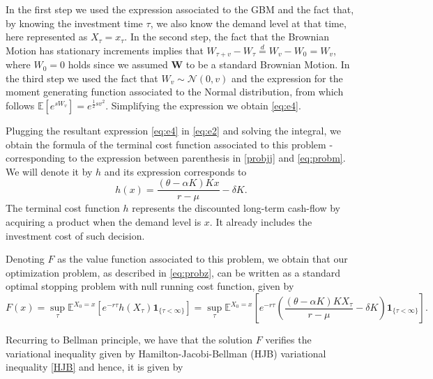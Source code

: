 In the first step we used the expression associated to the GBM and the fact that, by knowing the investment time $\tau$, we also know the demand level at that time, here represented as $X_\tau=x_\tau$. In the second step, the fact that the Brownian Motion has stationary increments implies that $W_{\tau+v}-W_\tau \overset{d}{=} W_v -W_0 = W_v$, where $W_0=0$ holds since we assumed \textbf{W} to be a standard Brownian Motion.
In the third step we used the fact that $ W_v \sim \mathcal{N}(0,v)$ and the expression for the moment generating function associated to the Normal distribution, from which follows $\mathds{E}\left[e^{sW_v}\right]=e^{\frac{1}{2} s v^2}$. Simplifying the expression we obtain \eqref{eq:e4}.

Plugging the resultant expression \eqref{eq:e4} in \eqref{eq:e2} and solving the integral, we obtain the formula of the terminal cost function associated to this problem - corresponding to the expression between parenthesis in \eqref{probjj} and \eqref{eq:probm}. We will denote it by $h$ and its expression corresponds to
\begin{equation}
h(x)=\frac{(\theta-\alpha K)K x}{r-\mu}- \delta K.
\label{prob1:h}
\end{equation}
The terminal cost function $h$ represents the discounted long-term cash-flow by acquiring a product when the demand level is $x$. It already includes the investment cost of such decision.
 
Denoting $F$ as the value function associated to this problem, we obtain that our optimization problem, as described in \eqref{eq:probz}, can be written as a standard optimal stopping problem with null running cost function, given by
\begin{equation}
F(x)=\sup_\tau \mathds{E}^{X_0=x}\left[e^{-r\tau } h(X_\tau) \textbf{1}_{\{\tau<\infty\}} \right]=\sup_\tau \mathds{E}^{X_0=x}\left[e^{-r\tau } \left( \frac{(\theta-\alpha K)K X_\tau}{r-\mu}-\delta K \right) \textbf{1}_{\{\tau<\infty\}} \right].
\label{eq:prob3}
\end{equation}



Recurring to Bellman principle, we have that the solution $F$ verifies the variational inequality given by Hamilton-Jacobi-Bellman (HJB) variational inequality \eqref{HJB} and hence, it is given by

